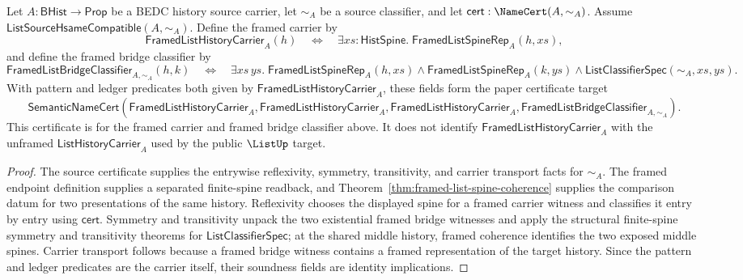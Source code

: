 \begin{corollary}
\label{cor:framed-list-carrier-certificate}
Let $A:\mathsf{BHist}\to\mathsf{Prop}$ be a BEDC history source carrier, let
$\sim_A$ be a source classifier, and let
$\mathsf{cert}:\NameCert(A,\sim_A)$. Assume
$\mathsf{ListSourceHsameCompatible}(A,\sim_A)$. Define the framed carrier by
$$
\mathsf{FramedListHistoryCarrier}_A(h)
\quad\Longleftrightarrow\quad
\exists xs:\mathsf{HistSpine}.\;\mathsf{FramedListSpineRep}_A(h,xs),
$$
and define the framed bridge classifier by
$$
\mathsf{FramedListBridgeClassifier}_{A,\sim_A}(h,k)
\quad\Longleftrightarrow\quad
\exists xs\,ys.\;
\mathsf{FramedListSpineRep}_A(h,xs)\land
\mathsf{FramedListSpineRep}_A(k,ys)\land
\mathsf{ListClassifierSpec}(\sim_A,xs,ys).
$$
With pattern and ledger predicates both given by
$\mathsf{FramedListHistoryCarrier}_A$, these fields form the paper certificate
target
$$
\mathsf{SemanticNameCert}(\mathsf{FramedListHistoryCarrier}_A,
\mathsf{FramedListHistoryCarrier}_A,
\mathsf{FramedListHistoryCarrier}_A,
\mathsf{FramedListBridgeClassifier}_{A,\sim_A}).
$$
This certificate is for the framed carrier and framed bridge classifier above.
It does not identify $\mathsf{FramedListHistoryCarrier}_A$ with the unframed
$\mathsf{ListHistoryCarrier}_A$ used by the public $\ListUp$ target.
\end{corollary}
\begin{proof}
The source certificate supplies the entrywise reflexivity, symmetry,
transitivity, and carrier transport facts for $\sim_A$. The framed endpoint
definition supplies a separated finite-spine readback, and
Theorem~\ref{thm:framed-list-spine-coherence} supplies the comparison datum for
two presentations of the same history. Reflexivity chooses the displayed spine
for a framed carrier witness and classifies it entry by entry using
$\mathsf{cert}$. Symmetry and transitivity unpack the two existential framed
bridge witnesses and apply the structural finite-spine symmetry and
transitivity theorems for $\mathsf{ListClassifierSpec}$; at the shared middle
history, framed coherence identifies the two exposed middle spines. Carrier
transport follows because a framed bridge witness contains a framed
representation of the target history. Since the pattern and ledger predicates
are the carrier itself, their soundness fields are identity implications.
\end{proof}

